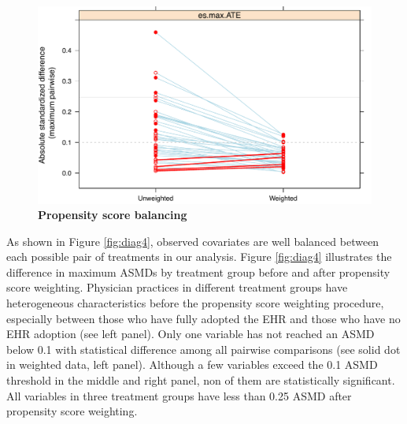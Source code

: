 \documentclass[12pt]{report}
\begin{document}
\begin{figure}[!htb]
\begin{center}
\includegraphics[width=\textwidth]{psdiag3.pdf}
\caption{{\bf Propensity score balancing}}
\label{fig:diag3}
\end{center}
\end{figure}

As shown in Figure \ref{fig:diag4}, observed covariates are well balanced between each possible pair of treatments in our analysis. Figure \ref{fig:diag4} illustrates the difference in maximum ASMDs by treatment group before and after propensity score weighting. Physician practices in different treatment groups have heterogeneous characteristics before the propensity score weighting procedure, especially between those who have fully adopted the EHR and those who have no EHR adoption (see left panel). Only one variable has not reached an ASMD below 0.1 with statistical difference among all pairwise comparisons (see solid dot in weighted data, left panel). Although a few variables exceed the 0.1 ASMD threshold in the middle and right panel, non of them are statistically significant. All variables in three treatment groups have less than 0.25 ASMD after propensity score weighting.
\end{document}
